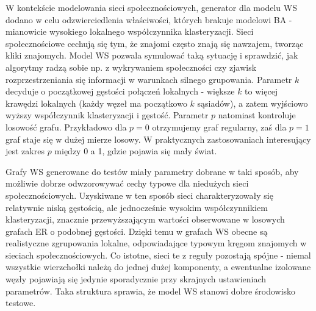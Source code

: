 W kontekście modelowania sieci społecznościowych, generator dla modelu WS dodano w celu odzwierciedlenia właściwości, których brakuje modelowi BA - mianowicie wysokiego lokalnego współczynnika klasteryzacji. Sieci społecznościowe cechują się tym, że znajomi często znają się nawzajem, tworząc kliki znajomych. Model WS pozwala symulować taką sytuację i sprawdzić, jak algorytmy radzą sobie np. z wykrywaniem społeczności czy zjawisk rozprzestrzeniania się informacji w warunkach silnego grupowania. Parametr $k$ decyduje o początkowej gęstości połączeń lokalnych - większe $k$ to więcej krawędzi lokalnych (każdy węzeł ma początkowo $k$ sąsiadów), a zatem wyjściowo wyższy współczynnik klasteryzacji i gęstość. Parametr $p$ natomiast kontroluje losowość grafu. Przykładowo dla $p=0$ otrzymujemy graf regularny, zaś dla $p=1$ graf staje się w dużej mierze losowy. W praktycznych zastosowaniach interesujący jest zakres $p$ między 0 a 1, gdzie pojawia się mały świat.

Grafy WS generowane do testów miały parametry dobrane w taki sposób, aby możliwie dobrze odwzorowywać cechy typowe dla niedużych sieci społecznościowych. Uzyskiwane w ten sposób sieci charakteryzowały się relatywnie niską gęstością, ale jednocześnie wysokim współczynnikiem klasteryzacji, znacznie przewyższającym wartości obserwowane w losowych grafach ER o podobnej gęstości. Dzięki temu w grafach WS obecne są realistyczne zgrupowania lokalne, odpowiadające typowym kręgom znajomych w sieciach społecznościowych. Co istotne, sieci te z reguły pozostają spójne - niemal wszystkie wierzchołki należą do jednej dużej komponenty, a ewentualne izolowane węzły pojawiają się jedynie sporadycznie przy skrajnych ustawieniach parametrów. Taka struktura sprawia, że model WS stanowi dobre środowisko testowe.




